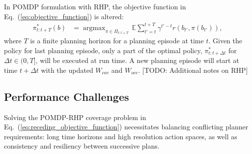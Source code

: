 \documentclass[letterpaper]{article} %
\newcommand{\phdone}[1]{} %
\newcommand{\argmax}{\mathop{\mathrm{argmax}}}
\begin{document}
\phdone{RHP Objective Function}
In POMDP formulation with RHP, the objective function in Eq.~(\ref{eq:objective_function}) is altered:
\begin{align}
  \pi_{t:t+T}^*(b) &= \argmax_{\pi \in \Pi_{t:t+T}} \, \mathbb{E} \sum_{t'=t}^{t+T} \gamma^{t'-t} r(b_{t'}, \pi(b_{t'})),
  \label{eq:receding_objective_function}
\end{align}
where $T$ is a finite planning horizon for a planning episode at time $t$.
Given the policy for last planning episode, only a part of the optimal policy, $\pi^*_{t:t+\Delta t}$ for $\Delta t \in (0, T]$, will be executed at run time. A new planning episode will start at time $t+\Delta t$ with the updated $W_{cov}$ and $W_{occ}$.
[TODO: Additional notes on RHP]







\subsection{Performance Challenges} \label{ssec:challenges}
Solving the POMDP-RHP coverage problem in Eq.~(\ref{eq:receding_objective_function}) necessitates balancing conflicting planner requirements: long time horizons and high resolution action spaces, as well as consistency and resiliency between successive plans.
\end{document}
